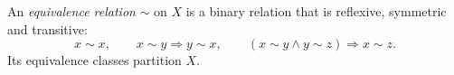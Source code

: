
An \emph{equivalence relation} $\sim$ on $X$ is a binary relation that is reflexive, symmetric and transitive:
\[
x\sim x,\qquad x\sim y\Rightarrow y\sim x,\qquad
(x\sim y\land y\sim z)\Rightarrow x\sim z.
\]
Its equivalence classes partition $X$.
